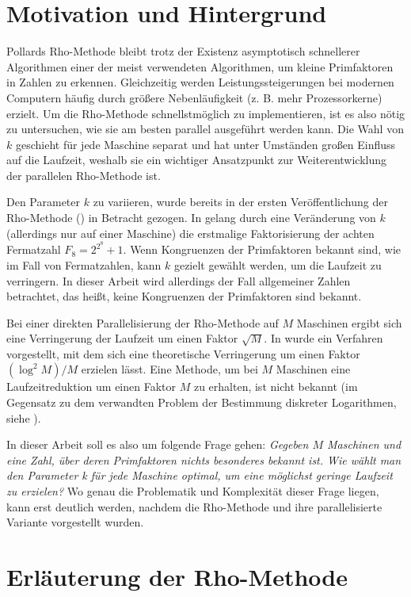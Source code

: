 \documentclass[a4paper, 11pt, ngerman]{article}
\theoremstyle{definition}
\theoremstyle{plain}
\theoremstyle{remark}
\begin{document}
\newpage

\section{Motivation und Hintergrund}

Pollards Rho-Methode bleibt trotz der Existenz asymptotisch schnellerer Algorithmen einer der meist verwendeten Algorithmen, um kleine Primfaktoren in Zahlen zu erkennen. Gleichzeitig werden Leistungssteigerungen bei modernen Computern häufig durch größere Nebenläufigkeit (z. B. mehr Prozessorkerne) erzielt. Um die Rho-Methode schnellstmöglich zu implementieren, ist es also nötig zu untersuchen, wie sie am besten parallel ausgeführt werden kann. Die Wahl von $k$ geschieht für jede Maschine separat und hat unter Umständen großen Einfluss auf die Laufzeit, weshalb sie ein wichtiger Ansatzpunkt zur Weiterentwicklung der parallelen Rho-Methode ist.

Den Parameter $k$ zu variieren, wurde bereits in der ersten Veröffentlichung der Rho-Methode (\cite{pol75}) in Betracht gezogen. In \cite{bp81} gelang durch eine Veränderung von $k$ (allerdings nur auf einer Maschine) die erstmalige Faktorisierung der achten Fermatzahl $F_8 = 2^{2^8} + 1$. Wenn Kongruenzen der Primfaktoren bekannt sind, wie im Fall von Fermatzahlen, kann $k$ gezielt gewählt werden, um die Laufzeit zu verringern. In dieser Arbeit wird allerdings der Fall allgemeiner Zahlen betrachtet, das heißt, keine Kongruenzen der Primfaktoren sind bekannt.

Bei einer direkten Parallelisierung der Rho-Methode auf $M$ Maschinen ergibt sich eine Verringerung der Laufzeit um einen Faktor $\sqrt M$. In \cite{cr99} wurde ein Verfahren vorgestellt, mit dem sich eine theoretische Verringerung um einen Faktor $(\log^2 M)/M$ erzielen lässt. Eine Methode, um bei $M$ Maschinen eine Laufzeitreduktion um einen Faktor $M$ zu erhalten, ist nicht bekannt (im Gegensatz zu dem verwandten Problem der Bestimmung diskreter Logarithmen, siehe \cite{vow99}).

In dieser Arbeit soll es also um folgende Frage gehen: \emph{Gegeben $M$ Maschinen und eine Zahl, über deren Primfaktoren nichts besonderes bekannt ist. Wie wählt man den Parameter k für jede Maschine optimal, um eine möglichst geringe Laufzeit zu erzielen?} Wo genau die Problematik und Komplexität dieser Frage liegen, kann erst deutlich werden, nachdem die Rho-Methode und ihre parallelisierte Variante vorgestellt wurden.

\section{Erläuterung der Rho-Methode}
\label{sec:pollards-rho-method}
\end{document}
